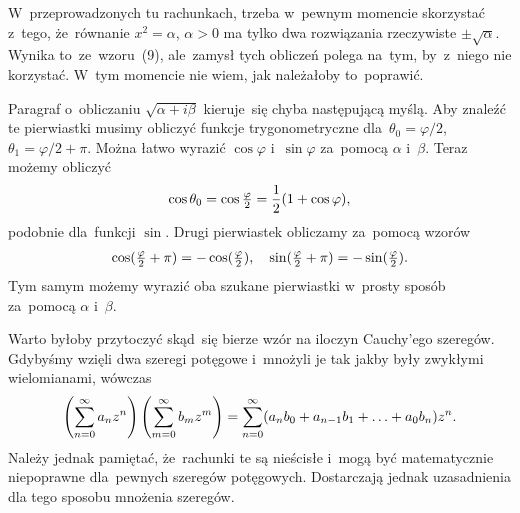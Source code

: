 \documentclass[a4paper,11pt]{article}
\begin{document}
\start {} W~przeprowadzonych tu rachunkach, trzeba w~pewnym
momencie skorzystać z~tego, że~równanie $x^{ 2 } = \alpha$,
$\alpha > 0$ ma tylko dwa rozwiązania rzeczywiste
$\pm \sqrt{ \alpha }$. Wynika to~ze~wzoru~(9), ale~zamysł tych
obliczeń polega na~tym, by~z~niego nie korzystać. W~tym momencie nie
wiem, jak należałoby to~poprawić.

\vspace{\spaceFour}


\start {} Paragraf o~obliczaniu $\sqrt{ \alpha + i \beta }$
kieruje~się chyba następującą myślą. Aby znaleźć te pierwiastki musimy
obliczyć funkcje trygonometryczne dla~$\theta_{ 0 } = \varphi / 2$,
$\theta_{ 1 } = \varphi / 2 + \pi$. Można łatwo wyrazić $\cos \varphi$
i~$\sin \varphi$ za~pomocą $\alpha$ i~$\beta$. Teraz możemy obliczyć
\begin{equation}
  \label{eq:Leja-11}
  \begin{split}
    \cos \theta_{ 0 } = \cos \tfrac{ \varphi }{ 2 } = \frac{ 1 }{ 2 } ( 1 + \cos
    \varphi ),
  \end{split}
\end{equation}
podobnie dla~funkcji $\sin$. Drugi pierwiastek obliczamy za~pomocą
wzorów
\begin{equation}
  \label{eq:Leja-12}
  \begin{split}
    \cos( \tfrac{ \varphi }{ 2 } + \pi ) = -\cos( \tfrac{ \varphi }{ 2 } ), \quad
    \sin( \tfrac{ \varphi }{ 2 } + \pi ) = -\sin( \tfrac{ \varphi }{ 2 } ).
  \end{split}
\end{equation}
Tym samym możemy wyrazić oba szukane pierwiastki w~prosty sposób
za~pomocą $\alpha$ i~$\beta$.

\vspace{\spaceFour}


\start {} Warto byłoby przytoczyć skąd~się bierze wzór na
iloczyn Cauchy'ego szeregów. Gdybyśmy wzięli dwa szeregi potęgowe
i~mnożyli je tak jakby były zwykłymi wielomianami, wówczas
\begin{equation}
  \label{eq:Leja-13}
  \begin{split}
    \left( \sum_{ n = 0 }^{ \infty } a_{ n } z^{ n } \right) \left(
      \sum_{ m = 0 }^{ \infty } b_{ m } z^{ m } \right) = \sum_{ n = 0
    }^{ \infty } ( a_{ n } b_{ 0 } + a_{ n - 1 } b_{ 1 } + \ldots + a_{ 0
    } b_{ n } ) z^{ n }.
  \end{split}
\end{equation}
Należy jednak pamiętać, że~rachunki te są nieścisłe i~mogą być
matematycznie niepoprawne dla~pewnych szeregów potęgowych. Dostarczają
jednak uzasadnienia dla tego sposobu mnożenia szeregów.
\end{document}
